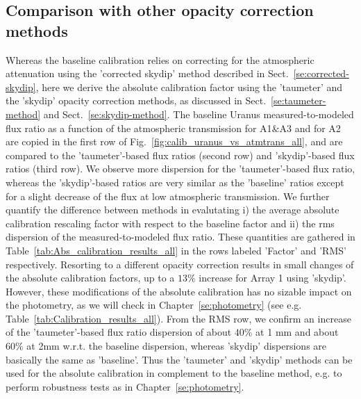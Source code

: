\subsection{Comparison with other opacity correction methods}

Whereas the baseline calibration relies on correcting for the
atmospheric attenuation using the 'corrected skydip' method described
in Sect.~\ref{se:corrected-skydip}, here we derive the absolute
calibration factor using the 'taumeter' and the 'skydip' opacity
correction methods, as discussed in Sect.~\ref{se:taumeter-method} and
Sect.~\ref{se:skydip-method}. The baseline Uranus measured-to-modeled
flux ratio as a function of the atmospheric transmission for A1$\&$A3
and for A2 are copied in the first row of
Fig.~\ref{fig:calib_uranus_vs_atmtrans_all}, and are
compared to the 'taumeter'-based flux ratios (second row) and
'skydip'-based flux ratios (third row). We observe more dispersion for
the 'taumeter'-based flux ratio, whereas the 'skydip'-based ratios are
very similar as the 'baseline' ratios except for a slight decrease of
the flux at low atmospheric transmission. We further quantify the
difference between methods in evalutating i) the average absolute
calibration rescaling factor with respect to the baseline factor and
ii) the rms dispersion of the measured-to-modeled flux ratio. These
quantities are gathered in Table~\ref{tab:Abs_calibration_results_all}
in the rows labeled 'Factor' and 'RMS' respectively. Resorting to a
different opacity correction results in small changes of the absolute
calibration factors, up to a $13\%$ increase for Array 1 using
'skydip'. However, these modifications of the absolute calibration has
no sizable impact on the photometry, as we will check in
Chapter~\ref{se:photometry} (see
e.g. Table~\ref{tab:Calibration_results_all}). From the RMS row, we
confirm an increase of the 'taumeter'-based flux ratio dispersion of
about $40\%$ at 1 mm and about $60\%$ at 2mm w.r.t. the baseline
dispersion, whereas 'skydip' dispersions are basically the same as
'baseline'. Thus the 'taumeter' and 'skydip' methods can be used for
the absolute calibration in complement to the baseline method, e.g. to
perform robustness tests as in Chapter~\ref{se:photometry}.  

  

